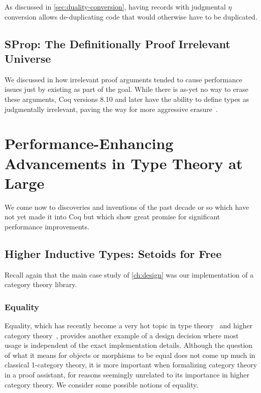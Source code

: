 As discussed in \autoref{sec:duality-conversion}, having records with judgmental $\eta$ conversion allows de-duplicating code that would otherwise have to be duplicated.

\subsection{SProp: The Definitionally Proof Irrelevant Universe}\label{sec:fixes:theory:sprop}\label{sec:sprop}
We discussed in  how irrelevant proof arguments tended to cause performance issues just by existing as part of the goal.
While there is as-yet no way to erase these arguments, Coq versions 8.10 and later have the ability to define types as judgmentally irrelevant, paving the way for more aggressive erasure~\cite{coq-pr-sprop,sprop}.

\section{Performance-Enhancing Advancements in Type Theory at Large}\label{sec:fixes:theory}
We come now to discoveries and inventions of the past decade or so which have not yet made it into Coq but which show great promise for significant performance improvements.

\subsection{Higher Inductive Types: Setoids for Free}\label{sec:fixes:theory:HITs}\label{sec:HITs}
Recall again that the main case study of \autoref{ch:design} was our implementation of a category theory library.

\subsubsection{Equality}\label{sec:equality}
Equality, which has recently become a very hot topic in type theory~\cite{HoTTBook} and higher category theory~\cite{Leinster2007}, provides another example of a design decision where most usage is independent of the exact implementation details.
Although the question of what it means for objects or morphisms to be equal does not come up much in classical 1-category theory, it is more important when formalizing category theory in a proof assistant, for reasons seemingly unrelated to its importance in higher category theory.
We consider some possible notions of equality.

